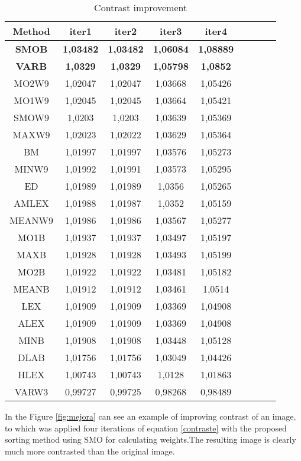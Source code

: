 \begin{table}
\caption{Contrast improvement}
\label{tab:EXP_N1}
\begin{tabular}{ccccccccc}
\hline Method&iter1&iter2&iter3&iter4\\
\hline  \textbf{SMOB}& \textbf{1,03482}& \textbf{1,03482}& \textbf{1,06084}& \textbf{1,08889}\\
\hline  \textbf{VARB}& \textbf{1,0329}& \textbf{1,0329}& \textbf{1,05798}& \textbf{1,0852}\\
\hline MO2W9&1,02047&1,02047&1,03668&1,05426\\
\hline MO1W9&1,02045&1,02045&1,03664&1,05421\\
\hline SMOW9&1,0203&1,0203&1,03639&1,05369\\
\hline MAXW9&1,02023&1,02022&1,03629&1,05364\\
\hline BM&1,01997&1,01997&1,03576&1,05273\\
\hline MINW9&1,01992&1,01991&1,03573&1,05295\\
\hline ED&1,01989&1,01989&1,0356&1,05265\\
\hline AMLEX&1,01988&1,01987&1,0352&1,05159\\
\hline MEANW9&1,01986&1,01986&1,03567&1,05277\\
\hline MO1B&1,01937&1,01937&1,03497&1,05197\\
\hline MAXB&1,01928&1,01928&1,03493&1,05199\\
\hline MO2B&1,01922&1,01922&1,03481&1,05182\\
\hline MEANB&1,01912&1,01912&1,03461&1,0514\\
\hline LEX&1,01909&1,01909&1,03369&1,04908\\
\hline ALEX&1,01909&1,01909&1,03369&1,04908\\
\hline MINB&1,01908&1,01908&1,03448&1,05128\\
\hline DLAB&1,01756&1,01756&1,03049&1,04426\\
\hline HLEX&1,00743&1,00743&1,0128&1,01863\\
\hline VARW3&0,99727&0,99725&0,98268&0,98489\\

\hline

\end{tabular}
\end{table}

In the Figure \ref{fig:mejora} can see an example of improving contrast of an image, to which was applied four iterations of equation \ref{contraste} with the proposed sorting method using SMO for calculating weights.The resulting image is clearly much more contrasted than the original image. 
 
